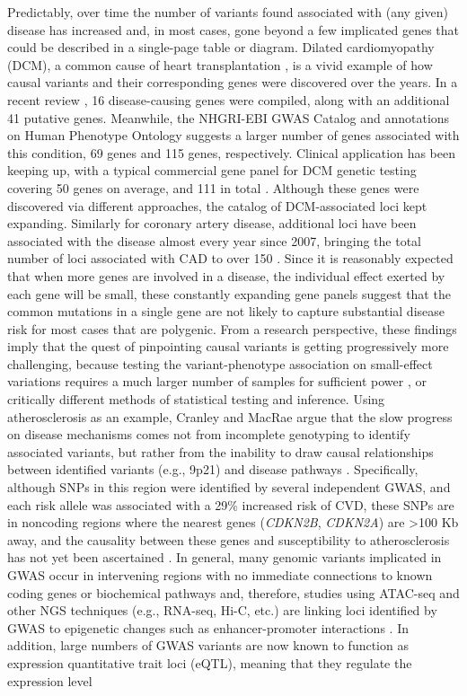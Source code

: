 \documentclass[letter]{bib}
\newcounter{example}[subsection]
\begin{document}
Predictably, over time the number of variants found associated with (any given) disease has increased and, in most cases, gone beyond a few implicated genes that could be described in a single-page table or diagram.  Dilated cardiomyopathy (DCM), a common cause of heart transplantation \citep{Burke:2016:Clinical}, is a vivid example of how causal variants and their corresponding genes were discovered over the years.  In a recent review \citep{Burke:2016:Clinical}, 16 disease-causing genes were compiled, along with an additional 41 putative genes.  Meanwhile, the NHGRI-EBI GWAS Catalog \citep{MacArthur:2017:new} and annotations on Human Phenotype Ontology \citep{Kohler:2017:Human} suggests a larger number of genes associated with this condition, 69 genes and 115 genes, respectively. Clinical application has been keeping up, with a typical commercial gene panel for DCM genetic testing covering 50 genes on average, and 111 in total \citep{McNally:2017:Dilated}. Although these genes were discovered via different approaches, the catalog of DCM-associated loci kept expanding. Similarly for coronary artery disease, additional loci have been associated with the disease almost every year since 2007, bringing the total number of loci associated with CAD to over 150 \citep{Clarke:2018:GenomeWide}.  Since it is reasonably expected that when more genes are involved in a disease, the individual effect exerted by each gene will be small, these constantly expanding gene panels suggest that the common mutations in a single gene are not likely to capture substantial disease risk for most cases that are polygenic. From a research perspective, these findings imply that the quest of pinpointing causal variants is getting progressively more challenging, because testing the variant-phenotype association on small-effect variations requires a much larger number of samples for sufficient power \citep{Visscher:2017:10}, or critically different methods of statistical testing and inference.  Using atherosclerosis as an example, Cranley and MacRae \citep{Cranley:2018:New} argue that the slow progress on disease mechanisms comes not from incomplete genotyping to identify associated variants, but rather from the inability to draw causal relationships between identified variants (e.g., 9p21) and disease pathways \citep{Lau:2018:Omics}.  Specifically, although SNPs in this region were identified by several independent GWAS, and each risk allele was associated with a 29\% increased risk of CVD, these SNPs are in noncoding regions where the nearest genes (\emph{CDKN2B}, \emph{CDKN2A}) are >100 Kb away, and the causality between these genes and susceptibility to atherosclerosis has not yet been ascertained \citep{Helgadottir:2007:Common,McPherson:2007:Common,Samani:2007:Genomewide}.  In general, many genomic variants implicated in GWAS occur in intervening regions with no immediate connections to known coding genes or biochemical pathways and, therefore, studies using ATAC-seq and other NGS techniques (e.g., RNA-seq, Hi-C, etc.) are linking loci identified by GWAS to epigenetic changes such as enhancer-promoter interactions \citep{Lau:2018:Omics}.  In addition, large numbers of GWAS variants are now known to function as expression quantitative trait loci (eQTL), meaning that they regulate the expression level 
\end{document}
